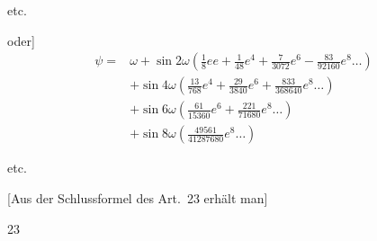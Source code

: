 {\centering etc.\par}
oder]
\[
\begin{aligned}
\psi={}&\omega+\sin2\omega(\tfrac18ee+\tfrac1{48}e^4+\tfrac7{3072}e^6-\tfrac{83}{92160}e^8\ldots)\\
&+\sin4\omega(\tfrac{13}{768}e^4+\tfrac{29}{3840}e^6+\tfrac{833}{368640}e^8\ldots)\\
&+\sin6\omega(\tfrac{61}{15360}e^6+\tfrac{221}{71680}e^8\ldots)\\
&+\sin8\omega(\tfrac{49561}{41287680}e^8\ldots)
\end{aligned}
\]
{\centering etc.\par}
[Aus der Schlussformel des Art.~23 erhält man]
\par{}\hfill{\small23}\hspace*{.12\linewidth}\par

